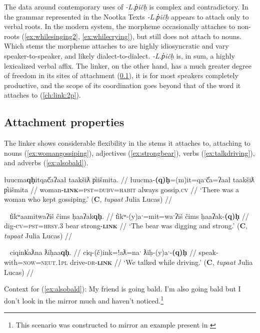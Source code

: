 The data around contemporary uses of \textit{-L.p̓ičḥ} is complex and contradictory. In the grammar represented in the Nootka Texts \citep{sapir1939} \textit{-L.p̓ičḥ} appears to attach only to verbal roots. In the modern system, the morpheme occasionally attaches to non-roots (\ref{ex:whilesinging2}, \ref{ex:whilecrying}), but still does not attach to nouns. Which stems the morpheme attaches to are highly idiosyncratic and vary speaker-to-speaker, and likely dialect-to-dialect. \textit{-L.p̓ičḥ} is, in sum, a highly lexicalized verbal affix. The linker, on the other hand, has a much greater degree of freedom in its sites of attachment (\ref{ch:link:attach}), it is for most speakers completely productive, and the scope of its coordination goes beyond that of the word it attaches to (\ref{ch:link:2p}).

\subsection{Attachment properties} \label{ch:link:attach}

The linker shows considerable flexibility in the stems it attaches to, attaching to nouns (\ref{ex:womangossiping}), adjectives (\ref{ex:strongbear}), verbs (\ref{ex:talkdriving}), and adverbs (\ref{ex:alsobald}).

\ex \label{ex:womangossiping}
\begingl
\glpreamble łuucma\textbf{qḥ}itqač̓aʔaał taakšiƛ p̓iišmita. //
\gla łuucma-\textbf{(q)ḥ}=(m)it=qaˑč̓a=ʔaał taakšiƛ p̓iišmita //
\glb woman-\textbf{\textsc{link}}=\textsc{pst}=\textsc{dubv}=\textsc{habit} always gossip.\textsc{cv} //
\glft `There was a woman who kept gossiping.' (\textbf{C}, \textit{tupaat} Julia Lucas) //
\endgl
\xe

\ex~ \label{ex:strongbear}
\begingl
\glpreamble t̓ikʷaamitwaʔiš čims ḥaaʔak\textbf{qḥ}. //
\gla t̓ikʷ-(y)aˑ=mit=waˑʔiš čims ḥaaʔak-\textbf{(q)ḥ} //
\glb dig-\textsc{cv}=\textsc{pst}=\textsc{hrsy.3} bear strong-\textbf{\textsc{link}} //
\glft `The bear was digging and strong.' (\textbf{C}, \textit{tupaat} Julia Lucas) //
\endgl
\xe

\ex~ \label{ex:talkdriving}
\begingl
\glpreamble ciqink̓aƛna ƛiḥaa\textbf{qḥ}. //
\gla ciq-(č)ink=!aƛ=naˑ ƛiḥ-(y)aˑ-\textbf{(q)ḥ} //
\glb speak-with=\textsc{now}=\textsc{neut.1pl} drive-\textsc{dr}-\textbf{\textsc{link}} //
\glft `We talked while driving.' (\textbf{C}, \textit{tupaat} Julia Lucas) //
\endgl
\xe

\noindent Context for (\ref{ex:alsobald}): My friend is going bald. I'm also going bald but I don't look in the mirror much and haven't noticed.\footnote{This scenario was constructed to mirror an example present in \cite{sapir1939}}


